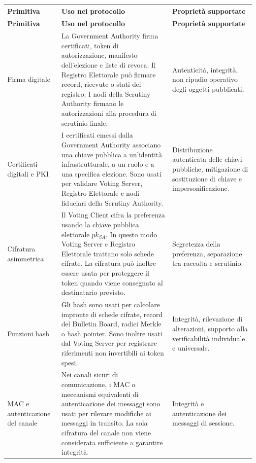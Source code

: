\documentclass[a4paper,12pt]{article}
\begin{document}
\begin{longtable}{|>{\raggedright\arraybackslash}p{}|>{\raggedright\arraybackslash}p{}|>{\raggedright\arraybackslash}p{}|}
	\hline
	\rowcolor{HeaderBlue}\textbf{Primitiva} & \textbf{Uso nel protocollo} & \textbf{Propriet\`a supportate} \\
	\hline
	\endfirsthead
	\hline
	\rowcolor{HeaderBlue}\textbf{Primitiva} & \textbf{Uso nel protocollo} & \textbf{Propriet\`a supportate} \\
	\hline
	\endhead

	Firma digitale &
	La Government Authority firma certificati, token di autorizzazione, manifesto dell'elezione e liste di revoca. Il Registro Elettorale pu\`o firmare record, ricevute o stati del registro. I nodi della Scrutiny Authority firmano le autorizzazioni alla procedura di scrutinio finale. &
	Autenticit\`a, integrit\`a, non ripudio operativo degli oggetti pubblicati. \\
	\hline

	Certificati digitali e PKI &
	I certificati emessi dalla Government Authority associano una chiave pubblica a un'identit\`a infrastrutturale, a un ruolo e a una specifica elezione. Sono usati per validare Voting Server, Registro Elettorale e nodi fiduciari della Scrutiny Authority. &
	Distribuzione autenticata delle chiavi pubbliche, mitigazione di sostituzione di chiave e impersonificazione. \\
	\hline

	Cifratura asimmetrica &
	Il Voting Client cifra la preferenza usando la chiave pubblica elettorale \(pk_{SA}\). In questo modo Voting Server e Registro Elettorale trattano solo schede cifrate. La cifratura pu\`o inoltre essere usata per proteggere il token quando viene consegnato al destinatario previsto. &
	Segretezza della preferenza, separazione tra raccolta e scrutinio. \\
	\hline

	Funzioni hash &
	Gli hash sono usati per calcolare impronte di schede cifrate, record del Bulletin Board, radici Merkle o hash pointer. Sono inoltre usati dal Voting Server per registrare riferimenti non invertibili ai token spesi. &
	Integrit\`a, rilevazione di alterazioni, supporto alla verificabilit\`a individuale e universale. \\
	\hline

	MAC e autenticazione del canale &
	Nei canali sicuri di comunicazione, i MAC o meccanismi equivalenti di autenticazione dei messaggi sono usati per rilevare modifiche ai messaggi in transito. La sola cifratura del canale non viene considerata sufficiente a garantire integrit\`a. &
	Integrit\`a e autenticazione dei messaggi di sessione. \\
	\hline


\end{longtable}
\end{document}
